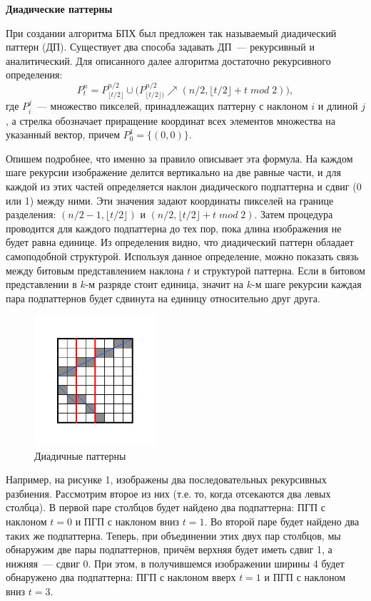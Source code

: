 \documentclass[a4paper,12pt]{article}
\begin{document}
{\bf Диадические паттерны}

При создании алгоритма БПХ был предложен так называемый диадический паттерн (ДП). Существует два способа задавать ДП~--- рекурсивный и аналитический. Для описанного далее алгоритма достаточно рекурсивного определения: \[P^n_t = P^{n/2}_{\lfloor t/2 \rfloor} \cup \Biggl( P^{n/2}_{\lfloor t/2 \rfloor)} \nearrow (n/2, \lfloor t/2 \rfloor + t\;mod\;2) \Biggr), \] где $P^j_i$~--- множество пикселей, принадлежащих паттерну с наклоном $i$ и длиной $j$, а стрелка обозначает приращение координат всех элементов множества на указанный вектор, причем $P^1_0 = \{(0, 0)\}$.

Опишем подробнее, что именно за правило описывает эта формула. На каждом шаге рекурсии изображение делится вертикально на две равные части, и для каждой из этих частей определяется наклон диадического подпаттерна и сдвиг (0 или 1) между ними. Эти значения задают координаты пикселей на границе разделения: $(n/2 - 1, \lfloor t/2 \rfloor)$ и $(n/2, \lfloor t/2 \rfloor + t\;mod\;2)$. Затем процедура проводится для каждого подпаттерна до тех пор, пока длина изображения не будет равна единице. Из определения видно, что диадический паттерн обладает самоподобной структурой. Используя данное определение, можно показать связь между битовым представлением наклона $t$ и структурой паттерна. Если в битовом представлении в $k$-м разряде стоит единица, значит на $k$-м шаге рекурсии каждая пара подпаттернов будет сдвинута на единицу относительно друг друга.

\begin{figure}[h!]
  \centering
  \includegraphics[width=0.4\textwidth]{pattern.png}
  \caption{Диадичные паттерны}
\end{figure}

Например, на рисунке 1, изображены два последовательных рекурсивных разбиения. Рассмотрим второе из них (т.е. то, когда отсекаются два левых столбца). В первой паре столбцов будет найдено два подпаттерна: ПГП с наклоном $t = 0$ и ПГП с наклоном вниз $t = 1$. Во второй паре будет найдено два таких же подпаттерна. Теперь, при объединении этих двух пар столбцов, мы обнаружим две пары подпаттернов, причём верхняя будет иметь сдвиг 1, а нижняя~--- сдвиг 0. При этом, в получившемся изображении ширины 4 будет обнаружено два подпаттерна: ПГП с наклоном вверх $t = 1$ и ПГП с наклоном вниз $t = 3$.
\end{document}
